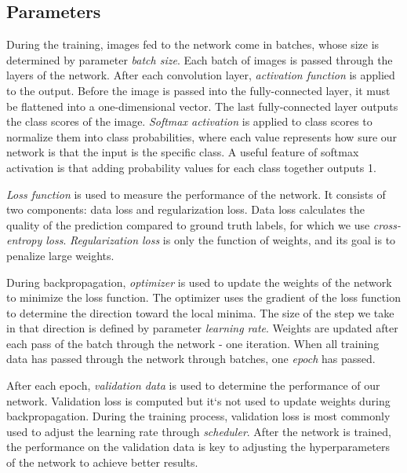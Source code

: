 \subsection{Parameters} \label{sec:parametersNetwork}



During the training, images fed to the network come in batches, whose size is determined by parameter \textit{batch size}. Each batch of images is passed through the layers of the network. After each convolution layer, \textit{activation function} is applied to the output. Before the image is passed into the fully-connected layer, it must be flattened into a one-dimensional vector. The last fully-connected layer outputs the class scores of the image. \textit{Softmax activation} is applied to class scores to normalize them into class probabilities, where each value represents how sure our network is that the input is the specific class. A useful feature of softmax activation is that adding probability values for each class together outputs 1. 

\textit{Loss function} is used to measure the performance of the network. It consists of two components: data loss and regularization loss. Data loss calculates the quality of the prediction compared to ground truth labels, for which we use \textit{cross-entropy loss}. \textit{Regularization loss} is only the function of weights, and its goal is to penalize large weights.  

During backpropagation, \textit{optimizer} is used to update the weights of the network to minimize the loss function. The optimizer uses the gradient of the loss function to determine the direction toward the local minima. The size of the step we take in that direction is defined by parameter \textit{learning rate}.  Weights are updated after each pass of the batch through the network - one iteration. When all training data has passed through the network through batches, one \textit{epoch} has passed.

After each epoch, \textit{validation data} is used to determine the performance of our network. Validation loss is computed but it‘s not used to update weights during backpropagation. During the training process, validation loss is most commonly used to adjust the learning rate through \textit{scheduler}. After the network is trained, the performance on the validation data is key to adjusting the hyperparameters of the network to achieve better results. 

